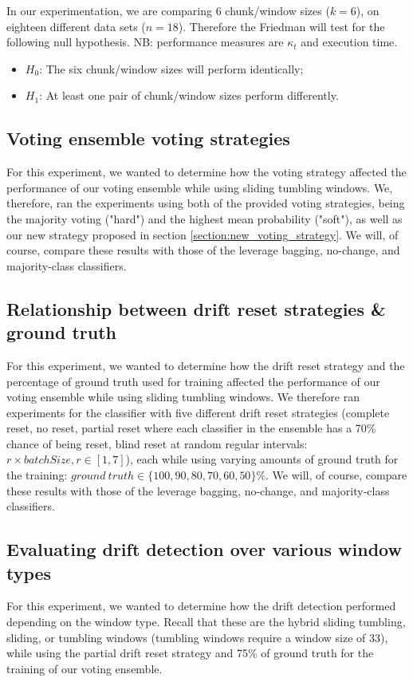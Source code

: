 In our experimentation, we are comparing 6 chunk/window sizes ($k=6$), on eighteen different data sets ($n=18$). Therefore the Friedman will test for the following null hypothesis. NB: performance measures are $\kappa_t$ and execution time.
\begin{itemize}
\item $H_0$: The six chunk/window sizes will perform identically;
\item $H_1$: At least one pair of chunk/window sizes perform differently.
\end{itemize}

\subsection{Voting ensemble voting strategies}
For this experiment, we wanted to determine how the voting strategy affected the performance of our voting ensemble while using sliding tumbling windows. We, therefore, ran the experiments using both of the provided voting strategies, being the majority voting ("hard") and the highest mean probability ("soft"), as well as our new strategy proposed in section \ref{section:new_voting_strategy}.
We will, of course, compare these results with those of the leverage bagging, no-change, and majority-class classifiers.

\subsection{Relationship between drift reset strategies \& ground truth}
For this experiment, we wanted to determine how the drift reset strategy and the percentage of ground truth used for training affected the performance of our voting ensemble while using sliding tumbling windows. We therefore ran experiments for the classifier with five different drift reset strategies (complete reset, no reset, partial reset where each classifier in the ensemble has a 70\% chance of being reset, blind reset at random regular intervals:  $r\times batchSize, r\in[1,7]$), each while using varying amounts of ground truth for the training: $ground\ truth \in \{100, 90, 80, 70, 60, 50\}\%$.
We will, of course,  compare these results with those of the leverage bagging, no-change, and majority-class classifiers.

\subsection{Evaluating drift detection over various window types}
For this experiment, we wanted to determine how the drift detection performed depending on the window type. Recall that these are the hybrid sliding tumbling, sliding, or tumbling windows (tumbling windows require a window size of 33), while using the partial drift reset strategy and 75\% of ground truth for the training of our voting ensemble.


